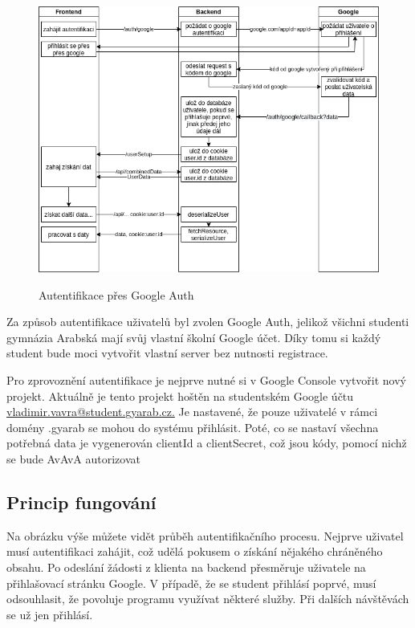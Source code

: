 \documentclass[a4paper,oneside,12pt]{report}
\begin{document}
\begin{figure}[h]
	\centering
	\includegraphics[height=9.5cm]{../img/authentication.png}
	\caption[Autentifikace přes Google Auth, vlastní tvorba]{Autentifikace přes Google Auth}
	\label{fig:architecture}
\end{figure}

Za způsob autentifikace uživatelů byl zvolen Google Auth, jelikož všichni studenti gymnázia Arabská mají svůj vlastní školní Google účet. Díky tomu si každý student bude moci vytvořit vlastní server bez nutnosti registrace.

Pro zprovoznění autentifikace je nejprve nutné si v Google Console vytvořit nový projekt.
Aktuálně je tento projekt hoštěn na studentském Google účtu \url{vladimir.vavra@student.gyarab.cz.} %
Je nastavené, že pouze uživatelé v rámci domény .gyarab se mohou do systému přihlásit.
Poté, co se nastaví všechna potřebná data je vygenerován clientId a clientSecret, což jsou kódy, pomocí nichž se bude AvAvA autorizovat

\subsection{Princip fungování}

Na obrázku výše můžete vidět průběh autentifikačního procesu.
Nejprve uživatel musí autentifikaci zahájit, což udělá pokusem o získání nějakého chráněného obsahu.
Po odeslání žádosti z klienta na backend přesměruje uživatele na přihlašovací stránku Google.
V případě, že se student přihlásí poprvé, musí odsouhlasit, že povoluje programu využívat některé služby.
Při dalších návštěvách se už jen přihlásí.
\end{document}
